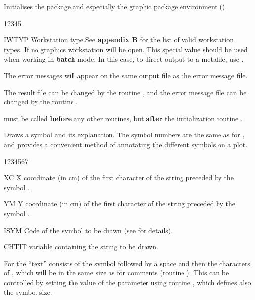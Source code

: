 \Action
Initialises the \HPLOT{} package and especially the graphic package environment
(\HIGZ{}).
\Pdesc
\begin{DLtt}{12345}
\item[IWTYP] Workstation type.See {\bf appendix B} for the list of valid
             workstation types. If  no
             graphics workstation will be open. This special value should be used 
            when working in
             {\bf batch} mode.  In this case, to direct output to
             a metafile, use .
\end{DLtt}
\Remarks
\begin{UL}
\item The \HPLOT{} error messages will appear on the same output file as the
      \HBOOK{} error message file.
\item The \HBOOK{} result file can be changed by the \HBOOK{} routine
      , and the \HBOOK{} error message file can be changed by the
      \HBOOK{} routine .
\item {} must be called {\bf before} any other \HPLOT{} routines, but
      {\bf after} the \HBOOK{} initialization routine .
\end{UL}


\Action
Draws a symbol and its explanation. The symbol numbers are the same as for 
, and  provides a convenient method of annotating the
different symbols on a plot.
\Pdesc
\begin{DLtt}{1234567}
\item[XC]    X coordinate (in cm) of the first character of the string preceded 
             by the symbol .
\item[YM]    Y coordinate (in cm) of the first character of the string preceded 
             by the symbol .
\item[ISYM]  Code of the symbol to be drawn (see  for details).
\item[CHTIT] \CHARACTER{} variable containing the string to be drawn.
\end{DLtt}
\Remark
For  the ``text'' consists of the symbol followed by a space and 
then the characters of , which will be in the same size as for 
comments (routine ). This can be controlled by setting the value of
the parameter  using routine , which defines also the 
symbol size.



